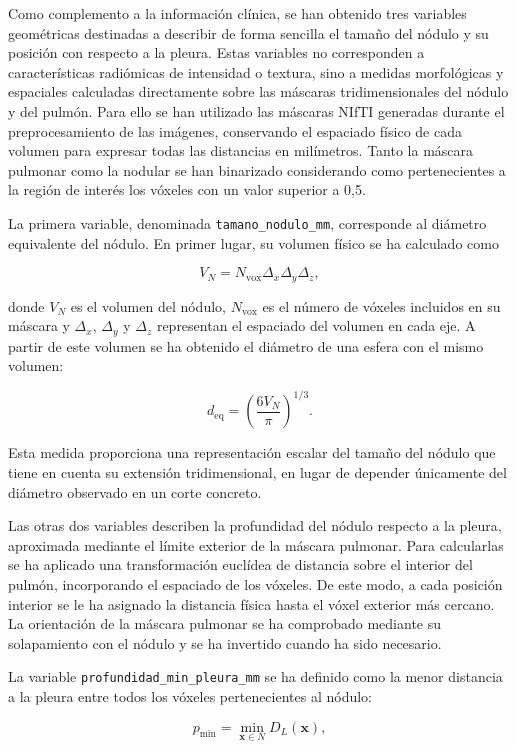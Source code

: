 Como complemento a la información clínica, se han obtenido tres variables geométricas destinadas a describir de forma sencilla el tamaño del nódulo y su posición con respecto a la pleura. Estas variables no corresponden a características radiómicas de intensidad o textura, sino a medidas morfológicas y espaciales calculadas directamente sobre las máscaras tridimensionales del nódulo y del pulmón. Para ello se han utilizado las máscaras NIfTI generadas durante el preprocesamiento de las imágenes, conservando el espaciado físico de cada volumen para expresar todas las distancias en milímetros. Tanto la máscara pulmonar como la nodular se han binarizado considerando como pertenecientes a la región de interés los vóxeles con un valor superior a 0,5.

La primera variable, denominada \texttt{tamano\_nodulo\_mm}, corresponde al diámetro equivalente del nódulo. En primer lugar, su volumen físico se ha calculado como

\[
V_N =
N_{\mathrm{vox}}
\Delta_x \Delta_y \Delta_z,
\]

donde \(V_N\) es el volumen del nódulo, \(N_{\mathrm{vox}}\) es el número de vóxeles incluidos en su máscara y \(\Delta_x\), \(\Delta_y\) y \(\Delta_z\) representan el espaciado del volumen en cada eje. A partir de este volumen se ha obtenido el diámetro de una esfera con el mismo volumen:

\[
d_{\mathrm{eq}} =
\left(
\frac{6V_N}{\pi}
\right)^{1/3}.
\]

Esta medida proporciona una representación escalar del tamaño del nódulo que tiene en cuenta su extensión tridimensional, en lugar de depender únicamente del diámetro observado en un corte concreto.

Las otras dos variables describen la profundidad del nódulo respecto a la pleura, aproximada mediante el límite exterior de la máscara pulmonar. Para calcularlas se ha aplicado una transformación euclídea de distancia sobre el interior del pulmón, incorporando el espaciado de los vóxeles. De este modo, a cada posición interior se le ha asignado la distancia física hasta el vóxel exterior más cercano. La orientación de la máscara pulmonar se ha comprobado mediante su solapamiento con el nódulo y se ha invertido cuando ha sido necesario.

La variable \texttt{profundidad\_min\_pleura\_mm} se ha definido como la menor distancia a la pleura entre todos los vóxeles pertenecientes al nódulo:

\[
p_{\min}
=
\min_{\mathbf{x}\in N} D_L(\mathbf{x}),
\]

